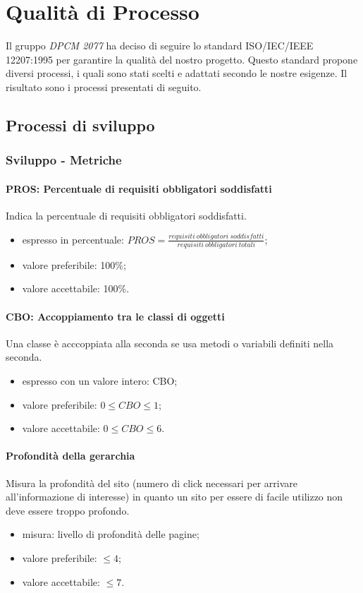 \section{Qualità di Processo}
Il gruppo \textit{DPCM 2077} ha deciso di seguire lo standard ISO/IEC/IEEE 12207:1995 per garantire la qualità del nostro progetto. Questo standard propone diversi processi, i quali sono stati scelti e adattati secondo le nostre esigenze. 
Il risultato sono i processi presentati di seguito.
	\subsection{Processi di sviluppo}
		\subsubsection{Sviluppo - Metriche}
		\paragraph{PROS: Percentuale di requisiti obbligatori soddisfatti}
		Indica la percentuale di requisiti obbligatori soddisfatti.
		\begin{itemize}
		\item espresso in percentuale: $PROS = \frac{requisiti \ obbligatori \ soddisfatti}{requisiti \ obbligatori \ totali}$;
		\item valore preferibile: 100\%;
		\item valore accettabile: 100\%.
		\end{itemize}
		
		\paragraph{CBO: Accoppiamento tra le classi di oggetti}
		Una classe è acccoppiata alla seconda se usa metodi o variabili definiti nella seconda.
		\begin{itemize}
		\item espresso con un valore intero: CBO;
		\item valore preferibile: $0 \leq CBO \leq 1$;
		\item valore accettabile: $0 \leq CBO \leq 6$.
		\end{itemize}
		
		\paragraph{Profondità della gerarchia}
		Misura la profondità del sito (numero di click necessari per arrivare all'informazione di interesse) in quanto un sito per essere di facile utilizzo non deve essere troppo profondo.
		\begin{itemize}
		\item misura: livello di profondità delle pagine;
		\item valore preferibile: $\leq 4$;
		\item valore accettabile: $ \leq 7$.
		\end{itemize}
		
